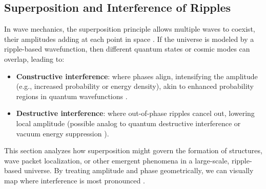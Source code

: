 \documentclass{article}
\begin{document}
\subsection{Superposition and Interference of Ripples}
\label{subsec:superposition}
In wave mechanics, the superposition principle allows multiple waves to 
coexist, their amplitudes adding at each point in space \cite{griffiths2005introduction, feynmanlectures}. 
If the universe is modeled by a ripple-based wavefunction, then different 
quantum states or cosmic modes can overlap, leading to:
\begin{itemize}
  \item \textbf{Constructive interference}: where phases align, intensifying 
        the amplitude (e.g., increased probability or energy density), akin 
        to enhanced probability regions in quantum wavefunctions \cite{wigner1932}.
  \item \textbf{Destructive interference}: where out-of-phase ripples cancel out, 
        lowering local amplitude (possible analog to quantum destructive interference 
        or vacuum energy suppression \cite{penrose2004, husimi1940some}).
\end{itemize}
This section analyzes how superposition might govern the formation of structures, 
wave packet localization, or other emergent phenomena in a large-scale, ripple-based 
universe. By treating amplitude and phase geometrically, we can visually map 
where interference is most pronounced \cite{schleich2001quantum, glauber1963}.
\end{document}
